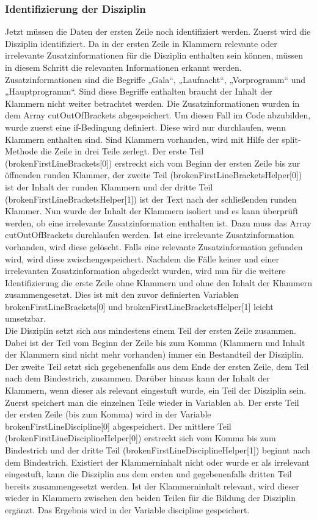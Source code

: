{\subsubsection{Identifizierung der Disziplin}
Jetzt müssen die Daten der ersten Zeile noch identifiziert werden. Zuerst wird die Disziplin identifiziert.
Da in der ersten Zeile in Klammern relevante oder irrelevante Zusatzinformationen für die Disziplin enthalten sein können, müssen in diesem Schritt die relevanten Informationen erkannt werden. Zusatzinformationen sind die Begriffe „Gala“, „Laufnacht“, „Vorprogramm“ und „Hauptprogramm“. Sind diese Begriffe enthalten braucht der Inhalt der Klammern nicht weiter betrachtet werden. Die Zusatzinformationen wurden in dem Array cutOutOfBrackets abgespeichert. Um diesen Fall im Code abzubilden, wurde zuerst eine if-Bedingung definiert. Diese wird nur durchlaufen, wenn Klammern enthalten sind. Sind Klammern vorhanden, wird mit Hilfe der split-Methode die Zeile in drei Teile zerlegt. Der erste Teil (brokenFirstLineBrackets[0]) erstreckt sich vom Beginn der ersten Zeile bis zur öffnenden runden Klammer, der zweite Teil (brokenFirstLineBracketsHelper[0]) ist der Inhalt der runden Klammern und der dritte Teil (brokenFirstLineBracketsHelper[1]) ist der Text nach der schließenden runden Klammer. Nun wurde der Inhalt der Klammern isoliert und es kann überprüft werden, ob eine irrelevante Zusatzinformation enthalten ist. Dazu muss das Array cutOutOfBrackets durchlaufen werden. Ist eine irrelevante Zusatzinformation vorhanden, wird diese gelöscht. Falls eine relevante Zusatzinformation gefunden wird, wird diese zwischengespeichert. Nachdem die Fälle keiner und einer irrelevanten Zusatzinformation abgedeckt wurden, wird nun für die weitere Identifizierung die erste Zeile ohne Klammern und ohne den Inhalt der Klammern zusammengesetzt. Dies ist mit den zuvor definierten Variablen brokenFirstLineBrackets[0] und brokenFirstLineBracketsHelper[1] leicht umsetzbar.\\
Die Disziplin setzt sich aus mindestens einem Teil der ersten Zeile zusammen. Dabei ist der Teil vom Beginn der Zeile bis zum Komma (Klammern und Inhalt der Klammern sind nicht mehr vorhanden) immer ein Bestandteil der Disziplin. Der zweite Teil setzt sich gegebenenfalls aus dem Ende der ersten Zeile, dem Teil nach dem Bindestrich, zusammen. Darüber hinaus kann der Inhalt der Klammern, wenn dieser als relevant eingestuft wurde, ein Teil der Disziplin sein.
Zuerst speichert man die einzelnen Teile wieder in Variablen ab. Der erste Teil der ersten Zeile (bis zum Komma) wird in der Variable brokenFirstLineDiscipline[0] abgespeichert. Der mittlere Teil (brokenFirstLineDisciplineHelper[0]) erstreckt sich vom Komma bis zum Bindestrich und der dritte Teil (brokenFirstLineDisciplineHelper[1]) beginnt nach dem Bindestrich. Existiert der Klammerninhalt nicht oder wurde er als irrelevant eingestuft, kann die Disziplin aus dem ersten und gegebenenfalls dritten Teil bereits zusammengesetzt werden. Ist der Klammerninhalt relevant, wird dieser wieder in Klammern zwischen den beiden Teilen für die Bildung der Disziplin ergänzt. Das Ergebnis wird in der Variable discipline gespeichert.\\
}
